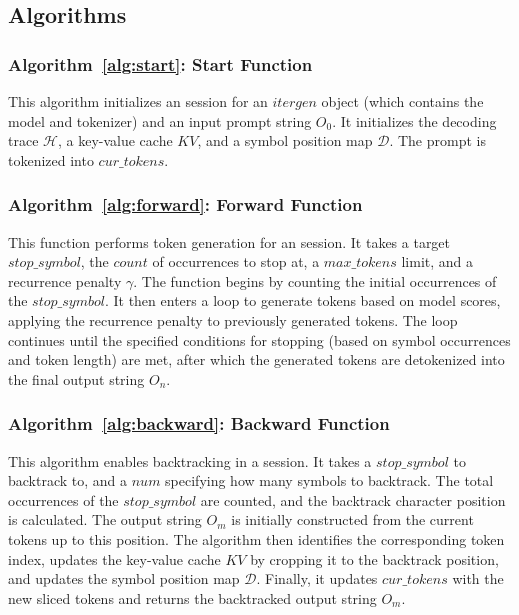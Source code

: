 \subsection{\Tool{} Algorithms}
\label{sec:algos}

\subsubsection{Algorithm~\ref{alg:start}: Start Function}
This algorithm initializes an \Tool{} session for an $\textit{itergen}$ object (which contains the model and tokenizer) and an input prompt string \( O_0 \). 
It initializes the decoding trace \( \mathcal{H} \), a key-value cache \( KV \), and a symbol position map \( \mathcal{D} \). 
The prompt is tokenized into $\textit{cur\_tokens}$.



\subsubsection{Algorithm~\ref{alg:forward}: Forward Function}
This function performs token generation for an \Tool{} session. 
It takes a target $\textit{stop\_symbol}$, the $\textit{count}$ of occurrences to stop at, a $\textit{max\_tokens}$ limit, and a recurrence penalty \( \gamma \). 
The function begins by counting the initial occurrences of the $\textit{stop\_symbol}$. 
It then enters a loop to generate tokens based on model scores, applying the recurrence penalty to previously generated tokens. 
The loop continues until the specified conditions for stopping (based on symbol occurrences and token length) are met, after which the generated tokens are detokenized into the final output string \( O_n \).




\subsubsection{Algorithm~\ref{alg:backward}: Backward Function}
This algorithm enables backtracking in a \Tool{} session. 
It takes a $\textit{stop\_symbol}$ to backtrack to, and a $\textit{num}$ specifying how many symbols to backtrack. 
The total occurrences of the $\textit{stop\_symbol}$ are counted, and the backtrack character position is calculated. 
The output string \( O_m \) is initially constructed from the current tokens up to this position. 
The algorithm then identifies the corresponding token index, updates the key-value cache \( KV \) by cropping it to the backtrack position, and updates the symbol position map \( \mathcal{D} \). 
Finally, it updates $\textit{cur\_tokens}$ with the new sliced tokens and returns the backtracked output string \( O_m \).

